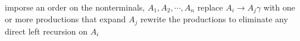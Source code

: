 \documentclass[varwidth=\maxdimen]{standalone}
\begin{document}
\begin{algorithmic}[1] %
  \State imporse an order on the nonterminals, $A_1, A_2, \cdots, A_n$
        \State replace $A_i\to A_j\gamma$ with one or more productions that expand $A_j$
      \EndIf
      \State rewrite the productions to eliminate any direct left recursion on $A_i$ 
    \EndFor
  \EndFor
  \EndFunction
\end{algorithmic}
\end{document}
